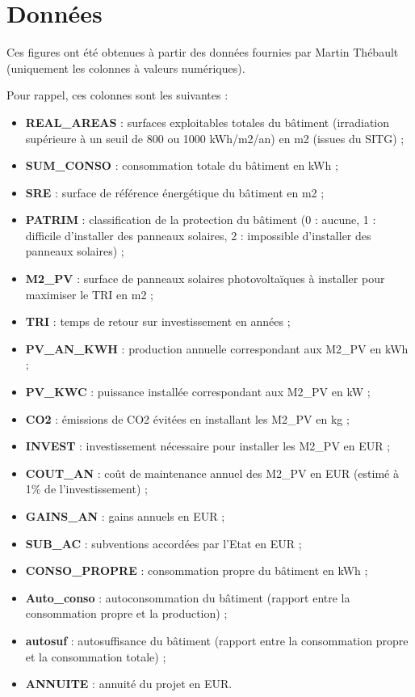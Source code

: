 \documentclass{article}
\begin{document}
\section{Données}

Ces figures ont été obtenues à partir des données fournies par Martin Thébault (uniquement les colonnes à valeurs numériques).

Pour rappel, ces colonnes sont les suivantes :

\begin{itemize}
    \item \textbf{REAL\_AREAS} : surfaces exploitables totales du bâtiment (irradiation supérieure à un seuil de 800 ou 1000 kWh/m2/an) en m2 (issues du SITG) ;
    \item \textbf{SUM\_CONSO} : consommation totale du bâtiment en kWh ;
    \item \textbf{SRE} : surface de référence énergétique du bâtiment en m2 ;
    \item \textbf{PATRIM} : classification de la protection du bâtiment (0 : aucune, 1 : difficile d'installer des panneaux solaires, 2 : impossible d'installer des panneaux solaires) ;
    \item \textbf{M2\_PV} : surface de panneaux solaires photovoltaïques à installer pour maximiser le TRI en m2 ;
    \item \textbf{TRI} : temps de retour sur investissement en années ;
    \item \textbf{PV\_AN\_KWH} : production annuelle correspondant aux M2\_PV en kWh ;
    \item \textbf{PV\_KWC} : puissance installée correspondant aux M2\_PV en kW ;
    \item \textbf{CO2} : émissions de CO2 évitées en installant les M2\_PV en kg ;
    \item \textbf{INVEST} : investissement nécessaire pour installer les M2\_PV en EUR ;
    \item \textbf{COUT\_AN} : coût de maintenance annuel des M2\_PV en EUR (estimé à 1\% de l'investissement) ;
    \item \textbf{GAINS\_AN} : gains annuels en EUR ;
    \item \textbf{SUB\_AC} : subventions accordées par l'Etat en EUR ;
    \item \textbf{CONSO\_PROPRE} : consommation propre du bâtiment en kWh ;
    \item \textbf{Auto\_conso} : autoconsommation du bâtiment (rapport entre la consommation propre et la production) ;
    \item \textbf{autosuf} : autosuffisance du bâtiment (rapport entre la consommation propre et la consommation totale) ;
    \item \textbf{ANNUITE} : annuité du projet en EUR.
\end{itemize}
\end{document}
